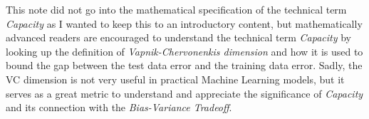 \documentclass[11pt]{article}   	%
\begin{document}
This note did not go into the mathematical specification of the technical term {\em Capacity} as I wanted to keep this to an introductory content, but mathematically advanced readers are encouraged to understand the technical term {\em Capacity} by looking up the definition of {\em Vapnik-Chervonenkis dimension} and how it is used to bound the gap between the test data error and the training data error. Sadly, the VC dimension is not very useful in practical Machine Learning models, but it serves as a great metric to understand and appreciate the significance of {\em Capacity} and its connection with the {\em Bias-Variance Tradeoff}.
\end{document}
